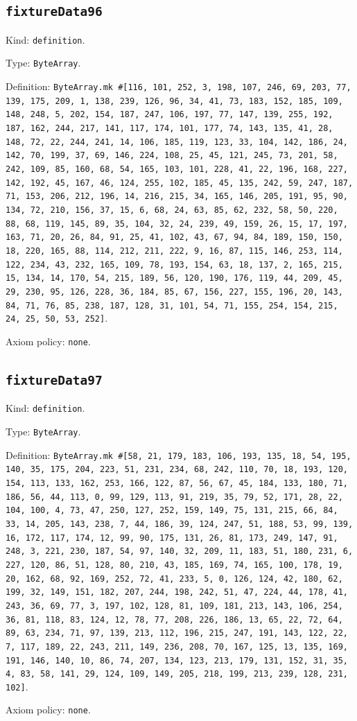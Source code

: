 \documentclass[11pt]{article}
\begin{document}
\subsection*{\texttt{fixtureData96}}
\noindent Kind: \texttt{definition}.\par
\noindent Type: \texttt{ByteArray}.\par
\noindent Definition: \texttt{ByteArray.mk \#[116, 101, 252, 3, 198, 107, 246, 69, 203, 77, 139, 175, 209, 1, 138, 239, 126, 96, 34, 41, 73, 183, 152, 185, 109, 148, 248, 5, 202, 154, 187, 247, 106, 197, 77, 147, 139, 255, 192, 187, 162, 244, 217, 141, 117, 174, 101, 177, 74, 143, 135, 41, 28, 148, 72, 22, 244, 241, 14, 106, 185, 119, 123, 33, 104, 142, 186, 24, 142, 70, 199, 37, 69, 146, 224, 108, 25, 45, 121, 245, 73, 201, 58, 242, 109, 85, 160, 68, 54, 165, 103, 101, 228, 41, 22, 196, 168, 227, 142, 192, 45, 167, 46, 124, 255, 102, 185, 45, 135, 242, 59, 247, 187, 71, 153, 206, 212, 196, 14, 216, 215, 34, 165, 146, 205, 191, 95, 90, 134, 72, 210, 156, 37, 15, 6, 68, 24, 63, 85, 62, 232, 58, 50, 220, 88, 68, 119, 145, 89, 35, 104, 32, 24, 239, 49, 159, 26, 15, 17, 197, 163, 71, 20, 26, 84, 91, 25, 41, 102, 43, 67, 94, 84, 189, 150, 150, 18, 220, 165, 88, 114, 212, 211, 222, 9, 16, 87, 115, 146, 253, 114, 122, 234, 43, 232, 165, 109, 78, 193, 154, 63, 18, 137, 2, 165, 215, 15, 134, 14, 170, 54, 215, 189, 56, 120, 190, 176, 119, 44, 209, 45, 29, 230, 95, 126, 228, 36, 184, 85, 67, 156, 227, 155, 196, 20, 143, 84, 71, 76, 85, 238, 187, 128, 31, 101, 54, 71, 155, 254, 154, 215, 24, 25, 50, 53, 252]}.\par
\noindent Axiom policy: \texttt{none}.\par
\subsection*{\texttt{fixtureData97}}
\noindent Kind: \texttt{definition}.\par
\noindent Type: \texttt{ByteArray}.\par
\noindent Definition: \texttt{ByteArray.mk \#[58, 21, 179, 183, 106, 193, 135, 18, 54, 195, 140, 35, 175, 204, 223, 51, 231, 234, 68, 242, 110, 70, 18, 193, 120, 154, 113, 133, 162, 253, 166, 122, 87, 56, 67, 45, 184, 133, 180, 71, 186, 56, 44, 113, 0, 99, 129, 113, 91, 219, 35, 79, 52, 171, 28, 22, 104, 100, 4, 73, 47, 250, 127, 252, 159, 149, 75, 131, 215, 66, 84, 33, 14, 205, 143, 238, 7, 44, 186, 39, 124, 247, 51, 188, 53, 99, 139, 16, 172, 117, 174, 12, 99, 90, 175, 131, 26, 81, 173, 249, 147, 91, 248, 3, 221, 230, 187, 54, 97, 140, 32, 209, 11, 183, 51, 180, 231, 6, 227, 120, 86, 51, 128, 80, 210, 43, 185, 169, 74, 165, 100, 178, 19, 20, 162, 68, 92, 169, 252, 72, 41, 233, 5, 0, 126, 124, 42, 180, 62, 199, 32, 149, 151, 182, 207, 244, 198, 242, 51, 47, 224, 44, 178, 41, 243, 36, 69, 77, 3, 197, 102, 128, 81, 109, 181, 213, 143, 106, 254, 36, 81, 118, 83, 124, 12, 78, 77, 208, 226, 186, 13, 65, 22, 72, 64, 89, 63, 234, 71, 97, 139, 213, 112, 196, 215, 247, 191, 143, 122, 22, 7, 117, 189, 22, 243, 211, 149, 236, 208, 70, 167, 125, 13, 135, 169, 191, 146, 140, 10, 86, 74, 207, 134, 123, 213, 179, 131, 152, 31, 35, 4, 83, 58, 141, 29, 124, 109, 149, 205, 218, 199, 213, 239, 128, 231, 102]}.\par
\noindent Axiom policy: \texttt{none}.\par
\end{document}

